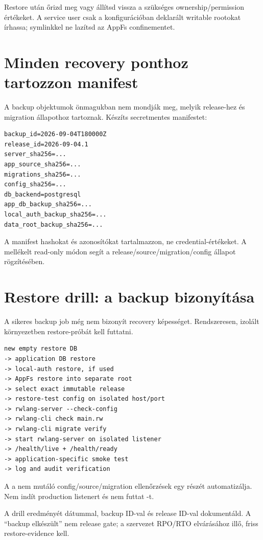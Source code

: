 Restore után őrizd meg vagy állítsd vissza a szükséges ownership/permission értékeket. A service user csak a konfigurációban deklarált writable rootokat írhassa; symlinkkel ne lazítsd az AppFs confinementet.

\section{Minden recovery ponthoz tartozzon manifest}

A backup objektumok önmagukban nem mondják meg, melyik release-hez és migration állapothoz tartoznak. Készíts secretmentes manifestet:

\begin{lstlisting}
backup_id=2026-09-04T180000Z
release_id=2026-09-04.1
server_sha256=...
app_source_sha256=...
migrations_sha256=...
config_sha256=...
db_backend=postgresql
app_db_backup_sha256=...
local_auth_backup_sha256=...
data_root_backup_sha256=...
\end{lstlisting}

A manifest hashokat és azonosítókat tartalmazzon, ne credential-értékeket. A mellékelt  read-only módon segít a release/source/migration/config állapot rögzítésében.

\section{Restore drill: a backup bizonyítása}

A sikeres backup job még nem bizonyít recovery képességet. Rendszeresen, izolált környezetben restore-próbát kell futtatni.

\begin{lstlisting}
new empty restore DB
-> application DB restore
-> local-auth restore, if used
-> AppFs restore into separate root
-> select exact immutable release
-> restore-test config on isolated host/port
-> rwlang-server --check-config
-> rwlang-cli check main.rw
-> rwlang-cli migrate verify
-> start rwlang-server on isolated listener
-> /health/live + /health/ready
-> application-specific smoke test
-> log and audit verification
\end{lstlisting}

A  a nem mutáló config/source/migration ellenőrzések egy részét automatizálja. Nem indít production listenert és nem futtat -t.

A drill eredményét dátummal, backup ID-val és release ID-val dokumentáld. A ``backup elkészült'' nem release gate; a szervezet RPO/RTO elvárásához illő, friss restore-evidence kell.

